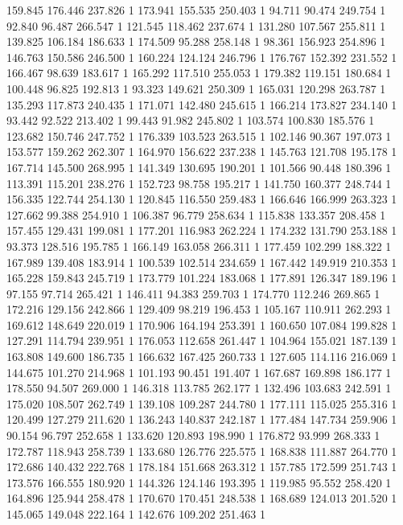 	159.845	176.446	237.826	1
	173.941	155.535	250.403	1
	94.711	90.474	249.754	1
	92.840	96.487	266.547	1
	121.545	118.462	237.674	1
	131.280	107.567	255.811	1
	139.825	106.184	186.633	1
	174.509	95.288	258.148	1
	98.361	156.923	254.896	1
	146.763	150.586	246.500	1
	160.224	124.124	246.796	1
	176.767	152.392	231.552	1
	166.467	98.639	183.617	1
	165.292	117.510	255.053	1
	179.382	119.151	180.684	1
	100.448	96.825	192.813	1
	93.323	149.621	250.309	1
	165.031	120.298	263.787	1
	135.293	117.873	240.435	1
	171.071	142.480	245.615	1
	166.214	173.827	234.140	1
	93.442	92.522	213.402	1
	99.443	91.982	245.802	1
	103.574	100.830	185.576	1
	123.682	150.746	247.752	1
	176.339	103.523	263.515	1
	102.146	90.367	197.073	1
	153.577	159.262	262.307	1
	164.970	156.622	237.238	1
	145.763	121.708	195.178	1
	167.714	145.500	268.995	1
	141.349	130.695	190.201	1
	101.566	90.448	180.396	1
	113.391	115.201	238.276	1
	152.723	98.758	195.217	1
	141.750	160.377	248.744	1
	156.335	122.744	254.130	1
	120.845	116.550	259.483	1
	166.646	166.999	263.323	1
	127.662	99.388	254.910	1
	106.387	96.779	258.634	1
	115.838	133.357	208.458	1
	157.455	129.431	199.081	1
	177.201	116.983	262.224	1
	174.232	131.790	253.188	1
	93.373	128.516	195.785	1
	166.149	163.058	266.311	1
	177.459	102.299	188.322	1
	167.989	139.408	183.914	1
	100.539	102.514	234.659	1
	167.442	149.919	210.353	1
	165.228	159.843	245.719	1
	173.779	101.224	183.068	1
	177.891	126.347	189.196	1
	97.155	97.714	265.421	1
	146.411	94.383	259.703	1
	174.770	112.246	269.865	1
	172.216	129.156	242.866	1
	129.409	98.219	196.453	1
	105.167	110.911	262.293	1
	169.612	148.649	220.019	1
	170.906	164.194	253.391	1
	160.650	107.084	199.828	1
	127.291	114.794	239.951	1
	176.053	112.658	261.447	1
	104.964	155.021	187.139	1
	163.808	149.600	186.735	1
	166.632	167.425	260.733	1
	127.605	114.116	216.069	1
	144.675	101.270	214.968	1
	101.193	90.451	191.407	1
	167.687	169.898	186.177	1
	178.550	94.507	269.000	1
	146.318	113.785	262.177	1
	132.496	103.683	242.591	1
	175.020	108.507	262.749	1
	139.108	109.287	244.780	1
	177.111	115.025	255.316	1
	120.499	127.279	211.620	1
	136.243	140.837	242.187	1
	177.484	147.734	259.906	1
	90.154	96.797	252.658	1
	133.620	120.893	198.990	1
	176.872	93.999	268.333	1
	172.787	118.943	258.739	1
	133.680	126.776	225.575	1
	168.838	111.887	264.770	1
	172.686	140.432	222.768	1
	178.184	151.668	263.312	1
	157.785	172.599	251.743	1
	173.576	166.555	180.920	1
	144.326	124.146	193.395	1
	119.985	95.552	258.420	1
	164.896	125.944	258.478	1
	170.670	170.451	248.538	1
	168.689	124.013	201.520	1
	145.065	149.048	222.164	1
	142.676	109.202	251.463	1
